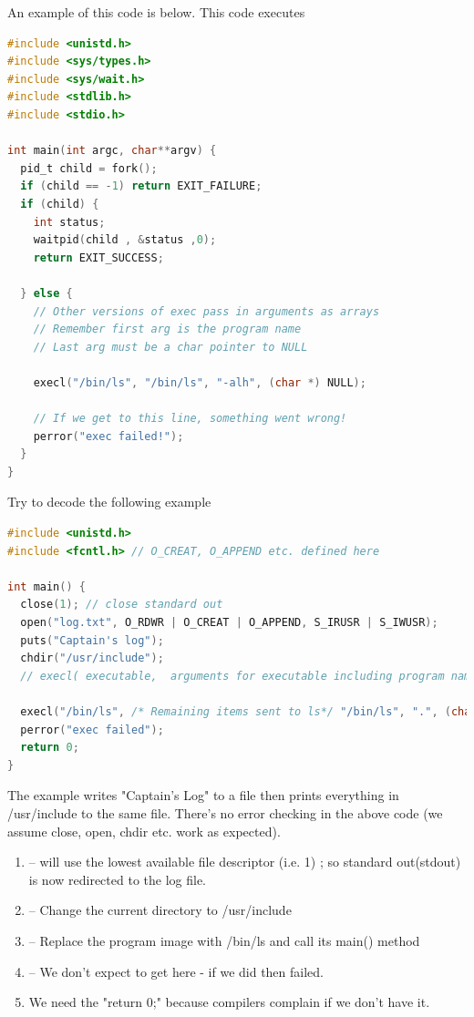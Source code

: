 An example of this code is below. This code executes 

\begin{lstlisting}[language=C]
#include <unistd.h>
#include <sys/types.h>
#include <sys/wait.h>
#include <stdlib.h>
#include <stdio.h>

int main(int argc, char**argv) {
  pid_t child = fork();
  if (child == -1) return EXIT_FAILURE;
  if (child) {
    int status;
    waitpid(child , &status ,0);
    return EXIT_SUCCESS;

  } else {
    // Other versions of exec pass in arguments as arrays
    // Remember first arg is the program name
    // Last arg must be a char pointer to NULL

    execl("/bin/ls", "/bin/ls", "-alh", (char *) NULL);

    // If we get to this line, something went wrong!
    perror("exec failed!");
  }
}
\end{lstlisting}

Try to decode the following example

\begin{lstlisting}[language=C]
#include <unistd.h>
#include <fcntl.h> // O_CREAT, O_APPEND etc. defined here

int main() {
  close(1); // close standard out
  open("log.txt", O_RDWR | O_CREAT | O_APPEND, S_IRUSR | S_IWUSR);
  puts("Captain's log");
  chdir("/usr/include");
  // execl( executable,  arguments for executable including program name and NULL at the end)

  execl("/bin/ls", /* Remaining items sent to ls*/ "/bin/ls", ".", (char *) NULL); // "ls ."
  perror("exec failed");
  return 0;
}
\end{lstlisting}

The example writes "Captain's Log" to a file then prints everything in /usr/include to the same file.
There's no error checking in the above code (we assume close, open, chdir etc. work as expected).

\begin{enumerate}
    \item {} -- will use the lowest available file descriptor (i.e. 1) ; so standard out(stdout) is now redirected to the log file.
    \item {} -- Change the current directory to /usr/include
    \item {} -- Replace the program image with /bin/ls and call its main() method
    \item {} -- We don't expect to get here - if we did then  failed.
    \item We need the "return 0;" because compilers complain if we don't have it.
\end{enumerate}

